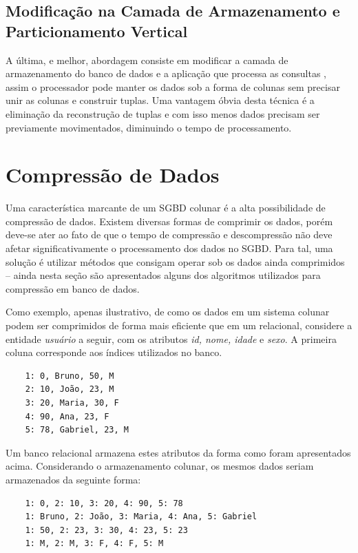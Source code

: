 \subsection{Modificação na Camada de Armazenamento e Particionamento Vertical}

A última, e melhor, abordagem consiste em modificar a camada de armazenamento do banco de dados e a aplicação que processa as consultas \cite{stonebraker2005c, boncz2005monetdb}, assim o processador pode manter os dados sob a forma de colunas sem precisar unir as colunas e construir tuplas. Uma vantagem óbvia desta técnica é a eliminação da reconstrução de tuplas e com isso menos dados precisam ser previamente movimentados, diminuindo 
o tempo de processamento.  

\section{Compressão de Dados}

Uma característica marcante de um SGBD colunar é a alta possibilidade de compressão de dados. 
Existem diversas formas de comprimir os dados, porém deve-se ater ao fato de 
que o tempo de compressão e descompressão não deve afetar significativamente o processamento 
dos dados no SGBD. Para tal, uma solução é utilizar métodos que consigam operar sob os dados 
ainda comprimidos -- ainda nesta seção são apresentados alguns dos algoritmos utilizados para 
compressão em banco de dados.

Como exemplo, apenas ilustrativo, de como os dados em um sistema colunar podem ser comprimidos de forma mais 
eficiente que em um relacional, considere a entidade \textit{usuário} a seguir, com os 
atributos \textit{id, nome, idade} e \textit{sexo}. A primeira coluna corresponde aos índices utilizados no banco. 

\begin{verbatim}
    1: 0, Bruno, 50, M
    2: 10, João, 23, M
    3: 20, Maria, 30, F
    4: 90, Ana, 23, F
    5: 78, Gabriel, 23, M
\end{verbatim}

Um banco relacional armazena estes atributos da forma como foram apresentados acima. 
Considerando o armazenamento colunar, os mesmos dados seriam armazenados da seguinte forma: 

\begin{verbatim}
    1: 0, 2: 10, 3: 20, 4: 90, 5: 78
    1: Bruno, 2: João, 3: Maria, 4: Ana, 5: Gabriel
    1: 50, 2: 23, 3: 30, 4: 23, 5: 23
    1: M, 2: M, 3: F, 4: F, 5: M
\end{verbatim}

